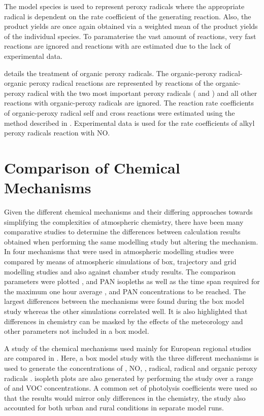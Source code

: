 The model species  is used to represent peroxy radicals where the appropriate  radical is dependent on the rate coefficient of the generating reaction. 
Also, the product yields are once again obtained via a weighted mean of the product yields of the individual species. 
To paramaterise the vast amount of reactions, very fast reactions are ignored and reactions with  are estimated due to the lack of experimental data. 

\citep{Kirchner:1996} details the treatment of organic peroxy radicals. 
The organic-peroxy radical-organic peroxy radical reactions are represented by reactions of the organic-peroxy radical with the two most important peroxy radicals ( and ) and all other reactions with organic-peroxy radicals are ignored. 
The reaction rate coefficients of organic-peroxy radical self and cross reactions were estimated using the method described in \citep{Kirchner:1996}. 
Experimental data is used for the rate coefficients of alkyl peroxy radicals reaction with NO. 

\section{Comparison of Chemical Mechanisms}
Given the different chemical mechanisms and their differing approaches towards simplifying the complexities of atmospheric chemistry, there have been many comparative studies to determine the differences between calculation results obtained when performing the same modelling study but altering the mechanism. 
In \citep{Dunker:1984} four mechanisms that were used in atmospheric modelling studies were compared by means of atmospheric simulations of box, trajectory and grid modelling studies and also against chamber study results. 
The comparison parameters were plotted ,  and PAN isopleths as well as the time span required for the maximum one hour average ,  and PAN concentrations to be reached. 
The largest differences between the mechanisms were found during the box model study whereas the other simulations correlated well. 
It is also highlighted that differences in chemistry can be masked by the effects of the meteorology and other parameters not included in a box model.

A study of the chemical mechanisms used mainly for European regional studies are compared in \citep{Gross:2003}. 
Here, a box model study with the three different mechanisms is used to generate the concentrations of , NO, ,  radical,  radical and organic peroxy radicals . 
 isopleth plots are also generated by performing the study over a range of  and VOC concentrations. 
A common set of photolysis coefficients were used so that the results would mirror only differences in the chemistry, the study also accounted for both urban and rural conditions in separate model runs.

